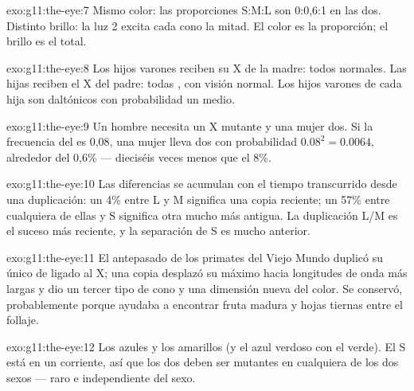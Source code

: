 \begin{solution}{exo:g11:the-eye:7}
Mismo color: las proporciones S:M:L son 0:0,6:1 en las dos. Distinto
brillo: la luz 2 excita cada cono la mitad. El color es la proporción;
el brillo es el total.
\end{solution}

\begin{solution}{exo:g11:the-eye:8}
Los hijos varones reciben su X de la madre: todos normales. Las hijas
reciben el X del padre: todas , con visión normal. Los hijos
varones de cada hija  son daltónicos con probabilidad un
medio.
\end{solution}

\begin{solution}{exo:g11:the-eye:9}
Un hombre necesita un X mutante y una mujer dos. Si la frecuencia del
 es 0,08, una mujer lleva dos con probabilidad $0.08^2 = 0.0064$,
alrededor del 0,6\% --- dieciséis veces menos que el 8\%.
\end{solution}

\begin{solution}{exo:g11:the-eye:10}
Las diferencias se acumulan con el tiempo transcurrido desde una
duplicación: un 4\% entre L y M significa una copia reciente; un 57\%
entre cualquiera de ellas y S significa otra mucho más antigua. La
duplicación L/M es el suceso más reciente, y la separación de S es
mucho anterior.
\end{solution}

\begin{solution}{exo:g11:the-eye:11}
El antepasado de los primates del Viejo Mundo duplicó su único  de
 ligado al X; una copia desplazó su máximo hacia longitudes de
onda más largas y dio un tercer tipo de cono y una dimensión nueva del
color. Se conservó, probablemente porque ayudaba a encontrar fruta
madura y hojas tiernas entre el follaje.
\end{solution}

\begin{solution}{exo:g11:the-eye:12}
Los azules y los amarillos (y el azul verdoso con el verde). El  S
está en un  corriente, así que los dos  deben ser
mutantes en cualquiera de los dos sexos --- raro e independiente del
sexo.
\end{solution}

